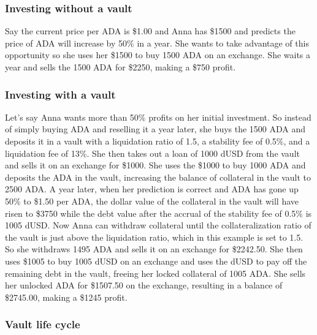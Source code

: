 \documentclass[12pt]{article}
\begin{document}
	\subsubsection{Investing without a vault}

Say the current price per ADA is \$1.00 and Anna has \$1500 and predicts the price of ADA will increase by 50\% in a year. She wants to take advantage of this opportunity so she uses her \$1500 to buy 1500 ADA on an exchange. She waits a year and sells the 1500 ADA for \$2250, making a \$750 profit.

	\subsubsection{Investing with a vault}

Let's say Anna wants more than 50\% profits on her initial investment. So instead of simply buying ADA and reselling it a year later, she buys the 1500 ADA and deposits it in a vault with a liquidation ratio of 1.5, a stability fee of 0.5\%, and a liquidation fee of 13\%. She then takes out a loan of 1000 dUSD from the vault and sells it on an exchange for \$1000. She uses the \$1000 to buy 1000 ADA and deposits the ADA in the vault, increasing the balance of collateral in the vault to 2500 ADA. A year later, when her prediction is correct and ADA has gone up 50\% to \$1.50 per ADA, the dollar value of the collateral in the vault will have risen to \$3750 while the debt value after the accrual of the stability fee of 0.5\% is 1005 dUSD. Now Anna can withdraw collateral until the collateralization ratio of the vault is just above the liquidation ratio, which in this example is set to 1.5. So she withdraws 1495 ADA and sells it on an exchange for \$2242.50. She then uses \$1005 to buy 1005 dUSD on an exchange and uses the dUSD to pay off the remaining debt in the vault, freeing her locked collateral of 1005 ADA. She sells her unlocked ADA for \$1507.50 on the exchange, resulting in a balance of \$2745.00, making a \$1245 profit.

	\subsubsection{Vault life cycle}
\end{document}
